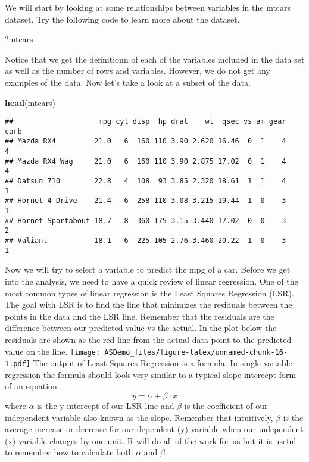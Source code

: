 \documentclass[]{book}
\newenvironment{Shaded}{\begin{snugshade}}{\end{snugshade}}
\newcommand{\KeywordTok}[1]{\textcolor[rgb]{0.13,0.29,0.53}{\textbf{#1}}}
\newcommand{\NormalTok}[1]{#1}
\begin{document}
We will start by looking at some relationships between variables in the
mtcars dataset. Try the following code to learn more about the dataset.

\begin{Shaded}
\begin{Highlighting}[]
\NormalTok{?mtcars}
\end{Highlighting}
\end{Shaded}

Notice that we get the definitionn of each of the variables included in
the data set as well as the number of rows and variables. However, we do
not get any examples of the data. Now let's take a look at a subset of
the data.

\begin{Shaded}
\begin{Highlighting}[]
\KeywordTok{head}\NormalTok{(mtcars)}
\end{Highlighting}
\end{Shaded}

\begin{verbatim}
##                    mpg cyl disp  hp drat    wt  qsec vs am gear carb
## Mazda RX4         21.0   6  160 110 3.90 2.620 16.46  0  1    4    4
## Mazda RX4 Wag     21.0   6  160 110 3.90 2.875 17.02  0  1    4    4
## Datsun 710        22.8   4  108  93 3.85 2.320 18.61  1  1    4    1
## Hornet 4 Drive    21.4   6  258 110 3.08 3.215 19.44  1  0    3    1
## Hornet Sportabout 18.7   8  360 175 3.15 3.440 17.02  0  0    3    2
## Valiant           18.1   6  225 105 2.76 3.460 20.22  1  0    3    1
\end{verbatim}

Now we will try to select a variable to predict the mpg of a car. Before
we get into the analysis, we need to have a quick review of linear
regression. One of the most common types of linear regression is the
Least Squares Regression (LSR). The goal with LSR is to find the line
that minimizes the residuals between the points in the data and the LSR
line. Remember that the residuals are the difference between our
predicted value vs the actual. In the plot below the residuals are shown
as the red line from the actual data point to the predicted value on the
line. \texttt{[image: ASDemo\_files/figure-latex/unnamed-chunk-16-1.pdf]}
The output of Least Squares Regression is a formula. In single variable
regression the formula should look very similar to a typical
slope-intercept form of an equation. \[y = \alpha + \beta \cdot x\]
where \(\alpha\) is the y-intercept of our LSR line and \(\beta\) is the
coefficient of our independent variable also known as the slope.
Remember that intuitively, \(\beta\) is the average increase or decrease
for our dependent (y) variable when our independent (x) variable changes
by one unit. R will do all of the work for us but it is useful to
remember how to calculate both \(\alpha\) and \(\beta\).
\end{document}
